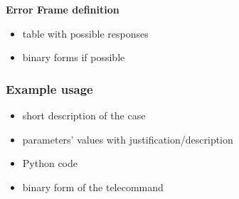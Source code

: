     \textbf{Error Frame definition}
    \begin{itemize}
        \item table with possible responses
        \item binary forms if possible
    \end{itemize}


\subsubsection{Example usage}

\begin{itemize}
    \item short description of the case
    \item parameters' values with justification/description
    \item Python code
    \item binary form of the telecommand
\end{itemize}
